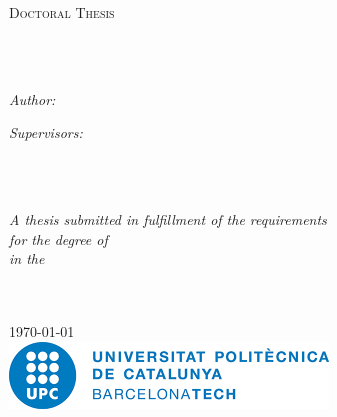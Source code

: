 \documentclass[
11pt,                   %
english,                %
singlespacing,          %
headsepline,            %
]{MastersDoctoralThesis}
\author{Miguel \textsc{Masó}} %
\begin{document}
\frontmatter %

\pagestyle{plain} %



\begin{titlepage}
\begin{center}

\vspace*{.06\textheight}
{\scshape\LARGE \univname\par}\vspace{1.5cm} %
\textsc{\Large Doctoral Thesis}\\[0.5cm] %

\HRule \\[0.4cm] %
{\huge \bfseries \ttitle\par}\vspace{0.4cm} %
\HRule \\[1.5cm] %
 
\begin{minipage}[t]{0.4\textwidth}
\begin{flushleft} \large
\emph{Author:}\\
\href{https://directori.upc.edu/directori/dadesPersona.jsp?id=1115243}{\authorname}
\end{flushleft}
\end{minipage}
\begin{minipage}[t]{0.4\textwidth}
\begin{flushright} \large
\emph{Supervisors:} \\
\href{http://www.cimne.com/eo}{\supname} \\
\href{https://www.cimne.com/1898/2181/people/directory}{\cosupname}
\end{flushright}
\end{minipage}\\[.3cm]
 
\vfill

\large \textit{A thesis submitted in fulfillment of the requirements\\ for the degree of \degreename}\\[0.3cm] %
\textit{in the}\\[0.3cm]
\groupname\\\deptname\\[.3cm] %
 
\vfill

{\large \today}\\[1cm]
\includegraphics[width=.5\textwidth]{img/logo_upc.png}
\vfill
\end{center}
\end{titlepage}
\end{document}
